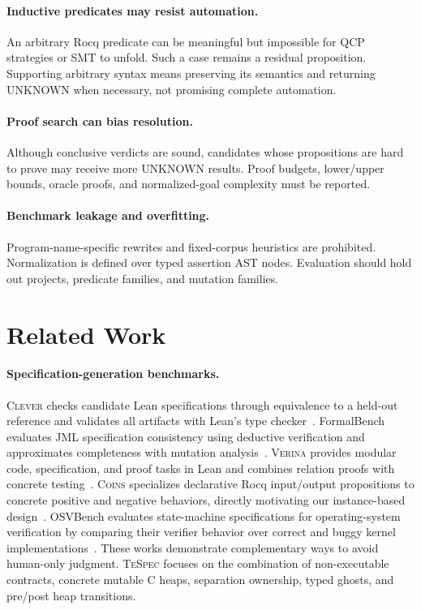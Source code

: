 \documentclass[10pt]{article}
\newcommand{\tespec}{\textsc{TeSpec}}
\newcommand{\coins}{\textsc{Coins}}
\newcommand{\verina}{\textsc{Verina}}
\newcommand{\rocq}{Rocq}
\newcommand{\unknown}{\textsf{UNKNOWN}}
\begin{document}
\paragraph{Inductive predicates may resist automation.}
An arbitrary \rocq{} predicate can be meaningful but impossible for QCP
strategies or SMT to unfold.  Such a case remains a residual proposition.
Supporting arbitrary syntax means preserving its semantics and returning
\unknown{} when necessary, not promising complete automation.

\paragraph{Proof search can bias resolution.}
Although conclusive verdicts are sound, candidates whose propositions are hard
to prove may receive more \unknown{} results.  Proof budgets, lower/upper
bounds, oracle proofs, and normalized-goal complexity must be reported.

\paragraph{Benchmark leakage and overfitting.}
Program-name-specific rewrites and fixed-corpus heuristics are prohibited.
Normalization is defined over typed assertion AST nodes.  Evaluation should
hold out projects, predicate families, and mutation families.

\section{Related Work}
\label{sec:related}

\paragraph{Specification-generation benchmarks.}
\textsc{Clever} checks candidate Lean specifications through equivalence to a
held-out reference and validates all artifacts with Lean's type
checker~\citep{thakur2025clever}.  FormalBench evaluates JML specification
consistency using deductive verification and approximates completeness with
mutation analysis~\citep{lecong2025formalbench}.  \verina{} provides modular
code, specification, and proof tasks in Lean and combines relation proofs with
concrete testing~\citep{ye2026verina}.  \coins{} specializes declarative
\rocq{} input/output propositions to concrete positive and negative behaviors,
directly motivating our instance-based design~\citep{yang2026coins}.
OSVBench evaluates state-machine specifications for operating-system
verification by comparing their verifier behavior over correct and buggy kernel
implementations~\citep{li2026osvbench}.  These works demonstrate complementary
ways to avoid human-only judgment.  \tespec{} focuses on the combination of
non-executable contracts, concrete mutable C heaps, separation ownership,
typed ghosts, and pre/post heap transitions.
\end{document}
